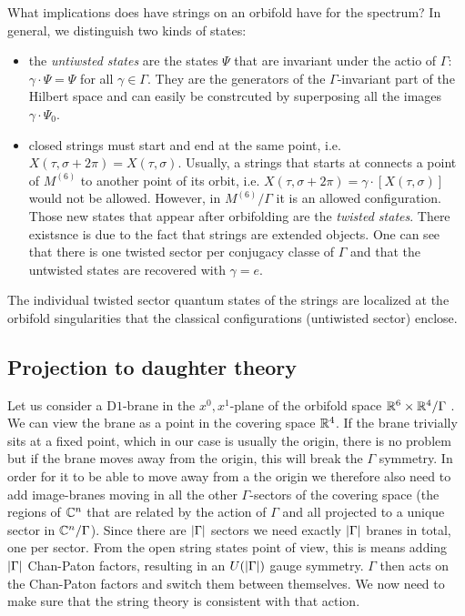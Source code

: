         What implications does have strings on an orbifold have for the spectrum? In general, we distinguish two kinds of states:
        \begin{itemize}
            \item the \emph{untiwsted states} are the states $\Psi$ that are invariant under the actio of $\Gamma$: $\gamma\cdot\Psi=\Psi$ for all $\gamma\in \Gamma$. They are the generators of the $\Gamma$-invariant part of the Hilbert space and can easily be constrcuted by superposing all the images $\gamma\cdot\Psi_0$.
            \item closed strings must start and end at the same point, i.e. $X(\tau,\sigma+2\pi)=X(\tau,\sigma)$. Usually, a strings that starts at connects a point of $M^{(6)}$ to another point of its orbit, i.e. $X(\tau,\sigma+2\pi)=\gamma\cdot[X(\tau,\sigma)]$ would not be allowed. However, in $M^{(6)}/\Gamma$ it is an allowed configuration. Those new states that appear after orbifolding are the \emph{twisted states}. There existsnce is due to the fact that strings are extended objects. One can see that there is one twisted sector per conjugacy classe of $\Gamma$  and that the untwisted states are recovered with $\gamma=e$.
        \end{itemize}
        The individual twisted sector quantum states of the strings are localized at the orbifold singularities that the classical configurations (untiwisted sector) enclose.

    \subsection{Projection to daughter theory}


        Let us consider a D$1$-brane in the $x^0,x^1$-plane of the orbifold space $\mathbb{R}^6\times\mathbb{R}^4/\Gamma$ \cite{johnson_1997,johnson_2002}. We can view the brane as a point in the covering space $\mathbb{R}^4$. If the brane trivially sits at a fixed point, which in our case is usually the origin, there is no problem but if the brane moves away from the origin, this will break the $\Gamma$ symmetry. In order for it to be able to move away from a the origin we therefore also need to add image-branes moving in all the other $\Gamma$-sectors of the covering space (the regions of $\mathbb{C}^n$ that are related by the action of $\Gamma$ and all projected to a unique sector in $\mathbb{C}^n/\Gamma$). Since there are $\abs{\Gamma}$ sectors we need exactly $\abs{\Gamma}$ branes in total, one per sector. From the open string states point of view, this is means adding $\abs{\Gamma}$ Chan-Paton factors, resulting in an $U(\abs{\Gamma})$ gauge symmetry. $\Gamma$ then acts on the Chan-Paton factors and switch them between themselves. We now need to make sure that the string theory is consistent with that action. 
        
